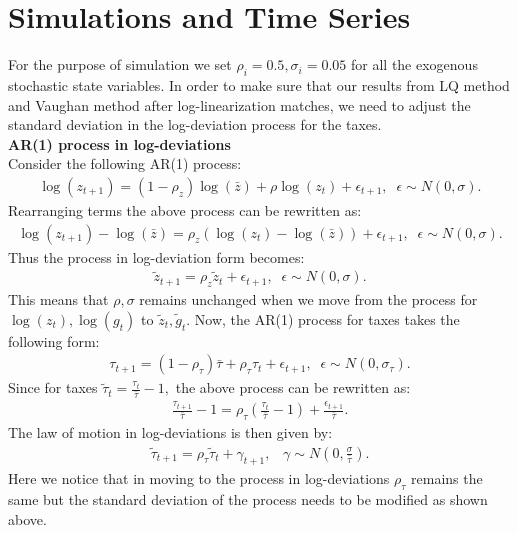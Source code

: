 \documentclass[12pt]{article}
\begin{document}
\section{Simulations and Time Series}
For the purpose of simulation we set $\rho_i = 0.5, \sigma_i = 0.05$ for all the exogenous stochastic state variables. In order to make sure that our results from LQ method and Vaughan method after log-linearization matches, we need to adjust the standard deviation in the log-deviation process for the taxes. \\
\textbf{AR(1) process in log-deviations}\\
Consider the following AR(1) process:
\begin{align*}
	\log (z_{t+1}) = (1-\rho_z) \log (\bar z) + \rho \log (z_{t} ) + \epsilon_{t+1}, \; \; \epsilon \sim N(0, \sigma).
\end{align*}
Rearranging terms the above process can be rewritten as:
\begin{align*}
	\log (z_{t+1})-\log (\bar z) = \rho_z (\log (z_{t} ) - \log (\bar z))+ \epsilon_{t+1}, \; \; \epsilon \sim N(0, \sigma).
\end{align*}
Thus the process in log-deviation form becomes:
\begin{align*}
	\tilde z_{t+1} = \rho_z \tilde z_t + \epsilon_{t+1}, \; \; \epsilon \sim N(0, \sigma).
\end{align*}
This means that $\rho, \sigma$ remains unchanged when we move from the process for $\log(z_t), \log(g_t)$ to $\tilde z_t, \tilde g_t$. Now, the AR(1) process for taxes takes the following form:
\begin{align*}
	\tau_{t+1} = (1-\rho_{\tau}) \bar \tau + \rho_{\tau} \tau_t + \epsilon_{t+1}, \; \; \epsilon \sim N(0, \sigma_{\tau}).
\end{align*}
Since for taxes $\tilde \tau_t = \frac{\tau_t}{\bar \tau}-1,$ the above process can be rewritten as:
\begin{align*}
	\frac{\tau_{t+1}}{\bar\tau} -1 =  \rho_{\tau}(\frac{\tau_t}{\bar \tau} -1) + \frac{\epsilon_{t+1}}{\bar\tau}.
\end{align*}
The law of motion in log-deviations is then given by:
\begin{align*}
	\tilde \tau_{t+1} = \rho_{\tau}\tilde\tau_t + \gamma_{t+1}, \;\;\; \gamma \sim N(0, \frac{\sigma}{\bar\tau}).
\end{align*}
Here we notice that in moving to the process in log-deviations $\rho_\tau$ remains the same but the standard deviation of the process needs to be modified as shown above.
\end{document}
